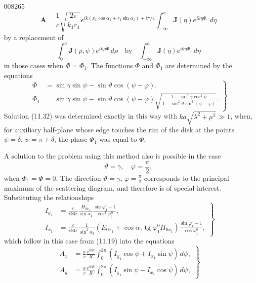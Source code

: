 \begin{scanpage}{0082}{65}
\[\mathbf A=\frac1c\sqrt{\frac{2\pi}{k_1r_1}}e^{ik(x_1\cos\alpha_1+r_1\sin\alpha_1)+i\pi/4}\int_{-\infty}^a\mathbf J(\eta)e^{ik\eta\Phi_1}\,d\eta\]
by a replacement of
\[\int_0^a\mathbf J(\rho,\psi)e^{ik\rho\Phi}\,d\rho\quad\text{by}\quad\int_{-\infty}^a\mathbf J(\eta)e^{ik\eta\Phi_1}\,d\eta\]
in those cases when $\Phi=\Phi_1$. The functions $\Phi$ and $\Phi_1$ are determined by the equations
\[
\left.\begin{aligned}
\Phi&=\sin\gamma\sin\psi-\sin\vartheta\cos(\psi-\varphi),\\
\Phi_1&=\sin\gamma\sin\psi-\sin\vartheta\cos(\psi-\varphi)\sqrt{\frac{1-\sin^2\gamma\cos^2\psi}{1-\sin^2\vartheta\sin^2(\psi-\varphi)}}.
\end{aligned}\right\}\tag{11.34}
\]
Solution (11.32) was determined exactly in this way with $ka\sqrt{\lambda^2+\mu^2}\gg1$, when, for auxiliary half-plane whose edge touches the rim of the disk at the points $\psi=\delta$, $\psi=\pi+\delta$, the phase $\Phi_1$ was equal to $\Phi$.

A solution to the problem using this method also is possible in the case
\[\vartheta=\gamma,\quad\varphi=\frac\pi2,\tag{11.35}\]
when $\Phi_1=\Phi=0$. The direction $\vartheta=\gamma$, $\varphi=\frac\pi2$ corresponds to the principal maximum of the scattering diagram, and therefore is of special interest. Substituting the relationships
\[
\left.\begin{aligned}
I_{y_1}&=\frac{c}{ik4\pi}\frac{H_{0x_1}}{\sin\alpha_1}\frac{\sin\varphi_1^0-1}{\cos^2\varphi_1^0},\\
I_{x_1}&=\frac{c}{ik4\pi}\frac1{\sin^2\alpha_1}(E_{0x_1}+\cos\alpha_1\operatorname{tg}\varphi_1^0 H_{0x_1})\frac{\sin\varphi_1^0-1}{\cos\varphi_1^0},
\end{aligned}\right\}\tag{11.36}
\]
which follow in this case from (11.19) into the equations
\[
\left.\begin{aligned}
A_x&=\frac ac\frac{e^{ikR}}R\int_0^{2\pi}(I_{y_1}\cos\psi+I_{x_1}\sin\psi)\,d\psi,\\
A_y&=\frac ac\frac{e^{ikR}}R\int_0^{2\pi}(I_{y_1}\sin\psi-I_{x_1}\cos\psi)\,d\psi,
\end{aligned}\right\}\tag{11.37}
\]
\end{scanpage}
